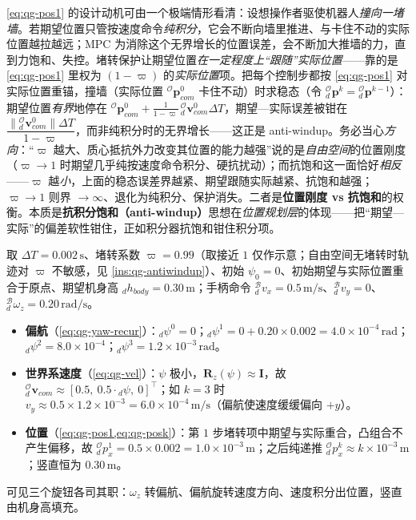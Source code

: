 \begin{insight}[堵转保护 = 位置规划层的抗积分饱和]\label{ins:qg-antiwindup}
\cref{eq:qg-pos1} 的设计动机可由一个极端情形看清：设想操作者驱使机器人\emph{撞向一堵墙}。若期望位置只管按速度命令\emph{纯积分}，它会不断向墙里推进、与卡住不动的实际位置越拉越远；MPC 为消除这个无界增长的位置误差，会不断加大推墙的力，直到力饱和、失控\cite{yu2021quadruped}。堵转保护让期望位置\emph{在一定程度上“跟随”实际位置}——靠的是 \cref{eq:qg-pos1} 里权为 $(1-\varpi)$ 的\emph{实际位置}项。把每个控制步都按 \cref{eq:qg-pos1} 对实际位置重锚，撞墙（实际位置 ${}^{\mathcal{O}}\boldsymbol{p}_{com}^{0}$ 卡住不动）时求稳态（令 ${}_d^{\mathcal{O}}\boldsymbol{p}^{k}={}_d^{\mathcal{O}}\boldsymbol{p}^{k-1}$）：期望位置\emph{有界}地停在 ${}^{\mathcal{O}}\boldsymbol{p}_{com}^{0}+\frac{1}{1-\varpi}\,{}_d^{\mathcal{O}}\boldsymbol{v}_{com}^{0}\Delta T$，期望—实际误差被钳在 $\dfrac{\|{}_d^{\mathcal{O}}\boldsymbol{v}_{com}^{0}\|\Delta T}{1-\varpi}$，而非纯积分时的无界增长——这正是 anti-windup。务必当心\emph{方向}：“$\varpi$ 越大、质心抵抗外力改变其位置的能力越强”说的是\emph{自由空间}的位置刚度（$\varpi\!\to\!1$ 时期望几乎纯按速度命令积分、硬抗扰动）；而抗饱和这一面恰好\emph{相反}——$\varpi$ 越\emph{小}，上面的稳态误差界越紧、期望跟随实际越紧、抗饱和越强；$\varpi\!\to\!1$ 则界 $\to\infty$、退化为纯积分、保护消失。二者是\textbf{位置刚度 vs 抗饱和}的权衡。本质是\textbf{抗积分饱和（anti-windup）}思想在\emph{位置规划层}的体现——把“期望—实际”的偏差软性钳住，正如积分器抗饱和钳住积分项。
\end{insight}

\begin{example}\label{exam:qg-com-recur}
取 $\Delta T=0.002\,\mathrm{s}$、堵转系数 $\varpi=0.99$（取接近 $1$ 仅作示意；自由空间无堵转时轨迹对 $\varpi$ 不敏感，见 \cref{ins:qg-antiwindup}）、初始 $\psi_0=0$、初始期望与实际位置重合于原点、期望机身高 ${}_dh_{body}=0.30\,\mathrm{m}$；手柄命令 ${}_d^{\mathcal{B}}v_x=0.5\,\mathrm{m/s}$、${}_d^{\mathcal{B}}v_y=0$、${}_d^{\mathcal{B}}\omega_z=0.20\,\mathrm{rad/s}$。
\begin{itemize}
  \item \textbf{偏航}（\cref{eq:qg-yaw-recur}）：${}_d\psi^0=0$；${}_d\psi^1=0+0.20\times0.002=4.0\times10^{-4}\,\mathrm{rad}$；${}_d\psi^2=8.0\times10^{-4}$；${}_d\psi^3=1.2\times10^{-3}\,\mathrm{rad}$。
  \item \textbf{世界系速度}（\cref{eq:qg-vel}）：$\psi$ 极小，$\mathbf{R}_z(\psi)\approx\mathbf{I}$，故 ${}_d^{\mathcal{O}}\boldsymbol{v}_{com}\approx[0.5,\ 0.5\cdot{}_d\psi,\ 0]^\top$；如 $k=3$ 时 $v_y\approx0.5\times1.2\times10^{-3}=6.0\times10^{-4}\,\mathrm{m/s}$（偏航使速度缓缓偏向 $+y$）。
  \item \textbf{位置}（\cref{eq:qg-pos1,eq:qg-posk}）：第 $1$ 步堵转项中期望与实际重合，凸组合不产生偏移，故 ${}_d^{\mathcal{O}}p_x^1=0.5\times0.002=1.0\times10^{-3}\,\mathrm{m}$；之后纯递推 ${}_d^{\mathcal{O}}p_x^k\approx k\times10^{-3}\,\mathrm{m}$；竖直恒为 $0.30\,\mathrm{m}$。
\end{itemize}
可见三个旋钮各司其职：$\omega_z$ 转偏航、偏航旋转速度方向、速度积分出位置，竖直由机身高填充。
\end{example}

